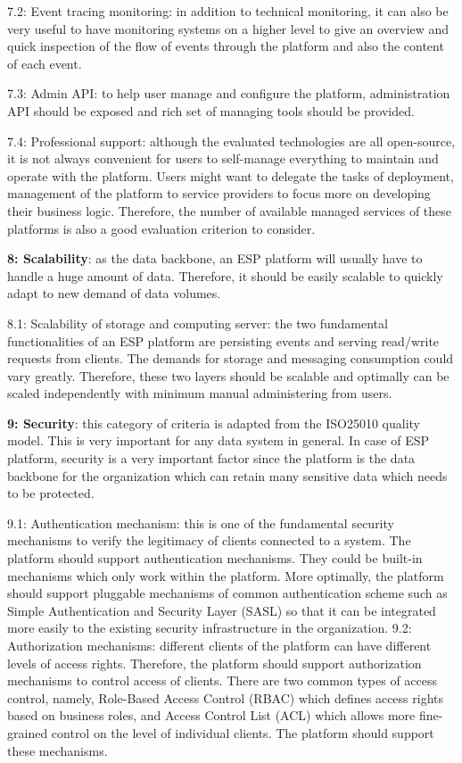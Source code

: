 7.2: Event tracing monitoring: in addition to technical monitoring, it can also be very useful to have monitoring systems on a higher level to give an overview and quick inspection of the flow of events through the platform and also the content of each event.

7.3: Admin API: to help user manage and configure the platform, administration API should be exposed and rich set of managing tools should be provided. 

7.4: Professional support: although the evaluated technologies are all open-source, it is not always convenient for users to self-manage everything to maintain and operate with the platform. Users might want to delegate the tasks of deployment, management of the platform to service providers to focus more on developing their business logic. Therefore, the number of available managed services of these platforms is also a good evaluation criterion to consider.


\textbf{8: Scalability}: as the data backbone, an ESP platform will usually have to handle a huge amount of data. Therefore, it should be easily scalable to quickly adapt to new demand of data volumes.

8.1: Scalability of storage and computing server: the two fundamental functionalities of an ESP platform are persisting events and serving read/write requests from clients. The demands for storage and messaging consumption could vary greatly. Therefore, these two layers should be scalable and optimally can be scaled independently with minimum manual administering from users.

\textbf{9: Security}: this category of criteria is adapted from the ISO25010 quality model. This is very important for any data system in general. In case of ESP platform, security is a very important factor since the platform is the data backbone for the organization which can retain many sensitive data which needs to be protected.

9.1: Authentication mechanism: this is one of the fundamental security mechanisms to verify the legitimacy of clients connected to a system. The platform should support authentication mechanisms. They could be built-in mechanisms which only work within the platform. More optimally, the platform should support pluggable mechanisms of common authentication scheme such as Simple Authentication and Security Layer (SASL) so that it can be integrated more easily to the existing security infrastructure in the organization.
9.2: Authorization mechanisms: different clients of the platform can have different levels of access rights. Therefore, the platform should support authorization mechanisms to control access of clients. There are two common types of access control, namely, Role-Based Access Control (RBAC) which defines access rights based on business roles, and Access Control List (ACL) which allows more fine-grained control on the level of individual clients. The platform should support these mechanisms.

